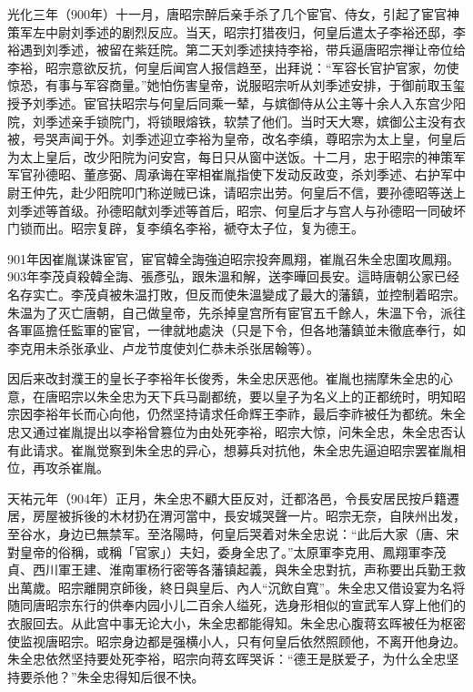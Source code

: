 光化三年（900年）十一月，唐昭宗醉后亲手杀了几个宦官、侍女，引起了宦官神策军左中尉刘季述的剧烈反应。当天，昭宗打猎夜归，何皇后遣太子李裕还邸，李裕遇到刘季述，被留在紫廷院。第二天刘季述挟持李裕，带兵逼唐昭宗禅让帝位给李裕，昭宗意欲反抗，何皇后闻宫人报信趋至，出拜说：“军容长官护官家，勿使惊恐，有事与军容商量。”她怕伤害皇帝，说服昭宗听从刘季述安排，于御前取玉玺授予刘季述。宦官扶昭宗与何皇后同乘一辇，与嫔御侍从公主等十余人入东宫少阳院，刘季述亲手锁院门，将锁眼熔铁，软禁了他们。当时天大寒，嫔御公主没有衣被，号哭声闻于外。刘季述迎立李裕为皇帝，改名李缜，尊昭宗为太上皇，何皇后为太上皇后，改少阳院为问安宫，每日只从窗中送饭。十二月，忠于昭宗的神策军军官孙德昭、董彦弼、周承诲在宰相崔胤指使下发动反政变，杀刘季述、右护军中尉王仲先，赴少阳院叩门称逆贼已诛，请昭宗出劳。何皇后不信，要孙德昭等送上刘季述等首级。孙德昭献刘季述等首后，昭宗、何皇后才与宫人与孙德昭一同破坏门锁而出。昭宗复辟，复李缜名李裕，褫夺太子位，复为德王。

901年因崔胤谋诛宦官，宦官韓全誨強迫昭宗投奔鳳翔，崔胤召朱全忠圍攻鳳翔。903年李茂貞殺韓全誨、張彥弘，跟朱溫和解，送李曄回長安。這時唐朝公家已经名存实亡。李茂貞被朱温打敗，但反而使朱溫變成了最大的藩鎮，並控制着昭宗。朱温为了灭亡唐朝，自己做皇帝，先杀掉皇宫所有宦官五千餘人，朱溫下令，派往各軍區擔任監軍的宦官，一律就地處決（只是下令，但各地藩鎮並未徹底奉行，如李克用未杀张承业、卢龙节度使刘仁恭未杀张居翰等）。

因后来改封濮王的皇长子李裕年长俊秀，朱全忠厌恶他。崔胤也揣摩朱全忠的心意，在唐昭宗以朱全忠为天下兵马副都统，要以皇子为名义上的正都统时，明知昭宗因李裕年长而心向他，仍然坚持请求任命辉王李祚，最后李祚被任为都统。朱全忠又通过崔胤提出以李裕曾篡位为由处死李裕，昭宗大惊，问朱全忠，朱全忠否认有此请求。崔胤觉察到朱全忠的异心，想募兵对抗他，朱全忠先逼迫昭宗罢崔胤相位，再攻杀崔胤。

天祐元年（904年）正月，朱全忠不顧大臣反对，迁都洛邑，令長安居民按戶籍遷居，房屋被拆後的木材扔在渭河當中，長安城哭聲一片。昭宗无奈，自陕州出发，至谷水，身边已無禁军。至洛陽時，何皇后哭着对朱全忠说：“此后大家（唐、宋對皇帝的俗稱，或稱「官家」）夫妇，委身全忠了。”太原軍李克用、鳳翔軍李茂貞、西川軍王建、淮南軍杨行密等各藩镇起義，與朱全忠對抗，声称要出兵勤王救出萬歲。昭宗離開京師後，終日與皇后、內人“沉飲自寬”。朱全忠又借设宴为名将随同唐昭宗东行的供奉内园小儿二百余人缢死，选身形相似的宣武军人穿上他们的衣服回去。从此宫中事无论大小，朱全忠都能得知。朱全忠心腹蒋玄晖被任为枢密使监视唐昭宗。昭宗身边都是强横小人，只有何皇后依然照顾他，不离开他身边。朱全忠依然坚持要处死李裕，昭宗向蒋玄晖哭诉：“德王是朕爱子，为什么全忠坚持要杀他？”朱全忠得知后很不快。

